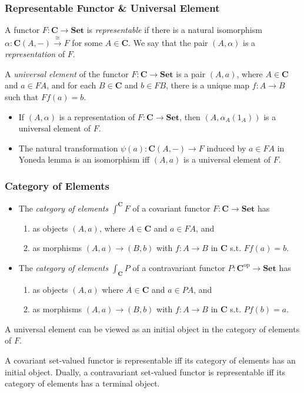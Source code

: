 \documentclass[UTF8,11pt,colorlinks,compress,openany]{beamer}%
\begin{document}
\begin{frame}\frametitle{Representable Functor \& Universal Element}
\begin{definition}
A functor $F:\mathbf{C}\to\mathbf{Set}$ is \emph{representable} if there is a natural isomorphism $\alpha:\mathbf{C}(A,-)\xrightarrow{\cong} F$ for some $A\in\mathbf{C}$. We say that the pair $(A,\alpha)$ is a \emph{representation} of $F$.
\end{definition}
\begin{definition}
	A \emph{universal element} of the functor $F:\mathbf{C}\to\mathbf{Set}$ is a pair $(A,a)$, where $A\in\mathbf{C}$ and $a\in FA$, and for each $B\in\mathbf{C}$ and $b\in FB$, there is a unique map $f: A\to B$ such that $Ff(a)=b$.
\end{definition}
\begin{itemize}
	\item If $(A,\alpha)$ is a representation of $F:\mathbf{C}\to\mathbf{Set}$, then $(A,\alpha_A(1_A))$ is a universal element of $F$.
	\item The natural transformation $\psi(a):\mathbf{C}(A,-)\to F$ induced by $a\in FA$ in Yoneda lemma is an isomorphism iff $(A,a)$ is a universal element of $F$.
\end{itemize}
\end{frame}

\begin{frame}\frametitle{Category of Elements}
\begin{definition}
	\begin{itemize}
		\item The \emph{category of elements} $\int^\mathbf{C} F$ of a covariant functor $F:\mathbf{C}\to\mathbf{Set}$ has 
		\begin{enumerate}
			\item as objects $(A,a)$, where $A\in\mathbf{C}$ and $a\in FA$, and
			\item as morphisms $(A,a)\to(B,b)$ with $f: A\to B$ in $\mathbf{C}$ s.t. $Ff(a)=b$.
		\end{enumerate}
		\item The \emph{category of elements} $\int_\mathbf{C} P$ of a contravariant functor $P:\mathbf{C}^\mathrm{op}\to\mathbf{Set}$ has 
		\begin{enumerate}
			\item as objects $(A,a)$ where $A\in\mathbf{C}$ and $a\in PA$, and
			\item as morphisms $(A,a)\to(B,b)$ with $f: A\to B$ in $\mathbf{C}$ s.t. $Pf(b)=a$.
		\end{enumerate}
	\end{itemize}
\end{definition}
A universal element can be viewed as an initial object in the category of elements of $F$.
\begin{theorem}
A covariant set-valued functor is representable iff its category of elements has an initial object. Dually, a contravariant set-valued functor is representable iff its category of elements has a terminal object.
\end{theorem}
\end{frame}
\end{document}

